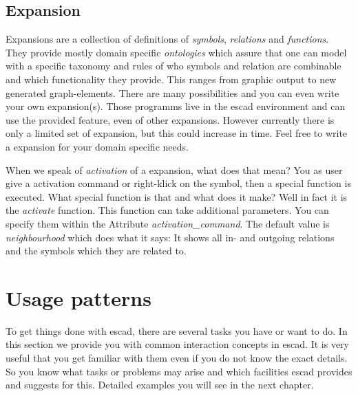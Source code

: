 \documentclass[a4paper, 12pt, openany]{scrbook}
\begin{document}
\subsection{Expansion}
Expansions are a collection of definitions of \emph{symbols}, \emph{relations} and \emph{functions}. They provide mostly domain specific \emph{ontologies} which assure that one can model with a specific taxonomy and rules of who symbols and relation are combinable and which functionality they provide. This ranges from graphic output to new generated graph-elements. There are many possibilities and you can even write your own expansion(s). Those programms live in the escad environment and can use the provided feature, even of other expansions. However currently there is only a limited set of expansion, but this could increase in time. Feel free to write a expansion for your domain specific needs.

When we speak of \emph{activation} of a expansion, what does that mean? You as user give a activation command or right-klick on the symbol, then a special function is executed. What special function is that and what does it make? Well in fact it is the \emph{activate} function. This function can take additional parameters. You can specify them within the Attribute \emph{activation\_command}. The default value is \emph{neighbourhood} which does what it says: It shows all in- and outgoing relations and the symbols which they are related to.
\section{Usage patterns}
To get things done with escad, there are several tasks you have or want to do. In this section we provide you with common interaction concepts in escad. It is very useful that you get familiar with them even if you do not know the exact details. So you know what tasks or problems may arise and which facilities escad provides and suggests for this. Detailed examples you will see in the next chapter.
\end{document}
